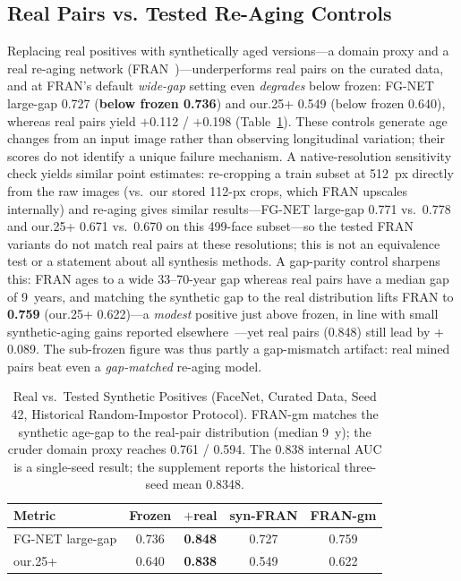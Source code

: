 \documentclass[journal]{IEEEtran}
\begin{document}
\subsection{Real Pairs vs. Tested Re-Aging Controls}\label{sec:res-synth}
Replacing real positives with synthetically aged versions---a domain proxy and a real re-aging network (FRAN~\cite{zoss2022fran})---underperforms real pairs on the curated data, and at FRAN's default \emph{wide-gap} setting even \emph{degrades} below frozen: FG-NET large-gap 0.727 (\textbf{below frozen 0.736}) and our.25+ 0.549 (below frozen 0.640), whereas real pairs yield $+$0.112 / $+$0.198 (Table~\ref{tab:synth}). These controls generate age changes from an input image rather than observing longitudinal variation; their scores do not identify a unique failure mechanism. A native-resolution sensitivity check yields similar point estimates: re-cropping a train subset at 512~px directly from the raw images (vs.\ our stored 112-px crops, which FRAN upscales internally) and re-aging gives similar results---FG-NET large-gap 0.771 vs.\ 0.778 and our.25+ 0.671 vs.\ 0.670 on this 499-face subset---so the tested FRAN variants do not match real pairs at these resolutions; this is not an equivalence test or a statement about all synthesis methods. A gap-parity control sharpens this: FRAN ages to a wide 33--70-year gap whereas real pairs have a median gap of 9~years, and matching the synthetic gap to the real distribution lifts FRAN to \textbf{0.759} (our.25+ 0.622)---a \emph{modest} positive just above frozen, in line with small synthetic-aging gains reported elsewhere~\cite{yao2024synthageing}---yet real pairs (0.848) still lead by $+$0.089. The sub-frozen figure was thus partly a gap-mismatch artifact: real mined pairs beat even a \emph{gap-matched} re-aging model.

\begin{table}[!t]
\renewcommand{\arraystretch}{1.15}
\caption{Real vs.\ Tested Synthetic Positives (FaceNet, Curated Data, Seed 42, Historical Random-Impostor Protocol). FRAN-gm matches the synthetic age-gap to the real-pair distribution (median 9~y); the cruder domain proxy reaches 0.761 / 0.594. The 0.838 internal AUC is a single-seed result; the supplement reports the historical three-seed mean 0.8348.}
\label{tab:synth}
\centering
\footnotesize
\begin{tabular}{@{}lcccc@{}}
\toprule
Metric & Frozen & $+$real & syn-FRAN & FRAN-gm \\
\midrule
FG-NET large-gap & 0.736 & \textbf{0.848} & 0.727 & 0.759 \\
our.25+ & 0.640 & \textbf{0.838} & 0.549 & 0.622 \\
\bottomrule
\end{tabular}
\end{table}
\end{document}
